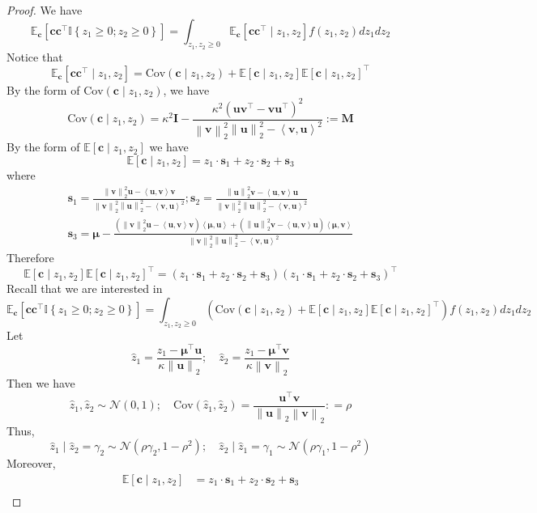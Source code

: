 \documentclass[10pt,a4paper]{amsart}
\def\bfI{{\mathbf{I}}}\def\bfJ{{\mathbf{J}}}\def\bfK{{\mathbf{K}}}\def\bfL{{\mathbf{L}}}
\def\bfM{{\mathbf{M}}}\def\bfN{{\mathbf{N}}}\def\bfO{{\mathbf{O}}}\def\bfP{{\mathbf{P}}}
\def\bfc{{\mathbf{c}}}\def\bfd{{\mathbf{d}}}
\def\bfs{{\mathbf{s}}}\def\bft{{\mathbf{t}}}
\def\bfu{{\mathbf{u}}}\def\bfv{{\mathbf{v}}}\def\bfw{{\mathbf{w}}}\def\bfx{{\mathbf{x}}}
\def\bfv{{\mathbf{v}}}\def\bfw{{\mathbf{w}}}\def\bfx{{\mathbf{x}}}
\newcommand{\inner}[2]{\left\langle#1, #2\right\rangle}
\newcommand{\norm}[1]{\left\|#1\right\|}
\newcommand{\paren}[1]{\left(#1\right)}
\providecommand{\E}{\mathbb{E}}
\begin{document}
\begin{proof}
    We have
    \[
        \E_{\bfc}\left[\bfc\bfc^\top\mathbb{I}\left\{z_1\geq 0;z_2\geq 0\right\}\right] = \int_{z_1,z_2\geq 0}\E_{\bfc}\left[\bfc\bfc^\top\mid z_1, z_2\right]f\paren{z_1, z_2}dz_1dz_2
    \]
    Notice that
    \[
        \E_{\bfc}\left[\bfc\bfc^\top\mid z_1, z_2\right] = \text{Cov}\paren{\bfc\mid z_1,z_2} + \E[\bfc\mid z_1,z_2]\E[\bfc\mid z_1,z_2]^\top
    \]
    By the form of $\text{Cov}\paren{\bfc\mid z_1,z_2}$, we have
    \[
        \text{Cov}\paren{\bfc\mid z_1,z_2} = \kappa^2\bfI - \frac{\kappa^2\paren{\bfu\bfv^\top - \bfv\bfu^\top}^2}{\norm{\bfv}_2^2\norm{\bfu}_2^2 - \inner{\bfv}{\bfu}^2}  := \bfM
    \]
    By the form of $\E[\bfc\mid z_1,z_2]$ we have
    \[
        \E[\bfc\mid z_1,z_2] = z_1\cdot\bfs_1 + z_2\cdot\bfs_2 + \bfs_3
    \]
    where 
    \begin{gather*}
        \bfs_1 = \frac{\norm{\bfv}_2^2\bfu - \inner{\bfu}{\bfv}\bfv}{\norm{\bfv}_2^2\norm{\bfu}_2^2 - \inner{\bfv}{\bfu}^2};  \bfs_2 = \frac{\norm{\bfu}_2^2\bfv - \inner{\bfu}{\bfv}\bfu}{\norm{\bfv}_2^2\norm{\bfu}_2^2 - \inner{\bfv}{\bfu}^2}\\
        \bfs_3 = \bm{\mu} - \frac{\paren{\norm{\bfv}_2^2\bfu - \inner{\bfu}{\bfv}\bfv}\inner{\bm{\mu}}{\bfu} + \paren{\norm{\bfu}_2^2\bfv - \inner{\bfu}{\bfv}\bfu}\inner{\bm{\mu}}{\bfv}}{\norm{\bfv}_2^2\norm{\bfu}_2^2 - \inner{\bfv}{\bfu}^2}
    \end{gather*}
    Therefore
    \[
        \E\left[\bfc\mid z_1,z_2\right]\E\left[\bfc\mid z_1,z_2\right]^\top = \paren{z_1\cdot\bfs_1 + z_2\cdot\bfs_2 + \bfs_3}\paren{z_1\cdot\bfs_1 + z_2\cdot\bfs_2 + \bfs_3}^\top
    \]
    Recall that we are interested in
    \[
        \E_{\bfc}\left[\bfc\bfc^\top\mathbb{I}\left\{z_1\geq 0;z_2\geq 0\right\}\right] = \int_{z_1,z_2\geq 0}\paren{\text{Cov}\paren{\bfc\mid z_1,z_2} + \E[\bfc\mid z_1,z_2]\E[\bfc\mid z_1,z_2]^\top}f(z_1,z_2)dz_1dz_2
    \]
    Let
    \[
        \hat{z}_1 = \frac{z_1 - \bm{\mu}^\top\bfu}{\kappa\norm{\bfu}_2};\quad \hat{z}_2 = \frac{z_1 - \bm{\mu}^\top\bfv}{\kappa\norm{\bfv}_2}
    \]
    Then we have
    \[
        \hat{z}_1,\hat{z}_2\sim\mathcal{N}(0,1);\quad \text{Cov}\paren{\hat{z}_1,\hat{z}_2} = \frac{\bfu^\top\bfv}{\norm{\bfu}_2\norm{\bfv}_2}: = \rho
    \]
    Thus,
    \[
        \hat{z}_1\mid \hat{z}_2 = \gamma_2 \sim\mathcal{N}\paren{\rho\gamma_2, 1- \rho^2};\quad \hat{z}_2\mid \hat{z}_1 = \gamma_1 \sim\mathcal{N}\paren{\rho\gamma_1, 1- \rho^2}
    \]
    Moreover,
    \begin{align*}
        \E[\bfc\mid z_1,z_2] & = z_1\cdot\bfs_1 + z_2\cdot\bfs_2 + \bfs_3\\

\end{align*}
\end{proof}
\end{document}
